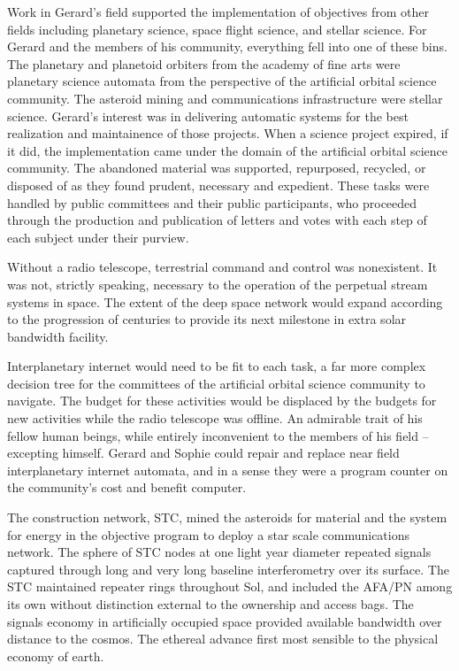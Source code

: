 Work in Gerard's field supported the implementation of objectives from
other fields including planetary science, space flight science, and
stellar science.  For Gerard and the members of his community,
everything fell into one of these bins.  The planetary and planetoid
orbiters from the academy of fine arts were planetary science automata
from the perspective of the artificial orbital science community.  The
asteroid mining and communications infrastructure were stellar
science.  Gerard's interest was in delivering automatic systems for
the best realization and maintainence of those projects.  When a
science project expired, if it did, the implementation came under the
domain of the artificial orbital science community.  The abandoned
material was supported, repurposed, recycled, or disposed of as they
found prudent, necessary and expedient.  These tasks were handled by
public committees and their public participants, who proceeded through
the production and publication of letters and votes with each step of
each subject under their purview.  

Without a radio telescope, terrestrial command and control was
nonexistent.  It was not, strictly speaking, necessary to the
operation of the perpetual stream systems in space.  The extent of the
deep space network would expand according to the progression of
centuries to provide its next milestone in extra solar bandwidth
facility.  

Interplanetary internet would need to be fit to each task, a far more
complex decision tree for the committees of the artificial orbital
science community to navigate.  The budget for these activities would
be displaced by the budgets for new activities while the radio
telescope was offline.  An admirable trait of his fellow human beings,
while entirely inconvenient to the members of his field -- excepting
himself.  Gerard and Sophie could repair and replace near field
interplanetary internet automata, and in a sense they were a program
counter on the community's cost and benefit computer.



The construction network, STC, mined the asteroids for material and
the system for energy in the objective program to deploy a star scale
communications network.  The sphere of STC nodes at one light year
diameter repeated signals captured through long and very long baseline
interferometry over its surface.  The STC maintained repeater rings
throughout Sol, and included the AFA/PN among its own without
distinction external to the ownership and access bags.  The signals
economy in artificially occupied space provided available bandwidth
over distance to the cosmos.  The ethereal advance first most sensible
to the physical economy of earth.



